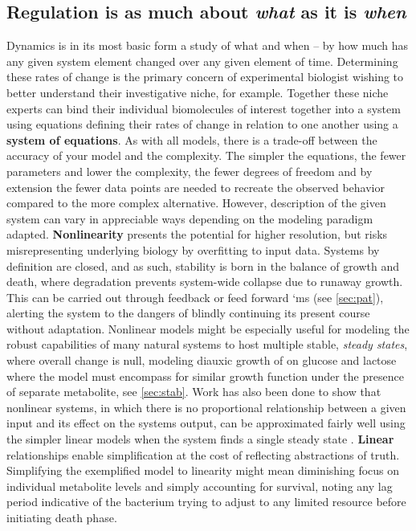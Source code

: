 \subsection{Regulation is as much about \emph{what} as it is \emph{when}}
\label{sec:regwhatwhen}
Dynamics is in its most basic form a study of what and when -- by how much has any given system element changed over any given element of time. Determining these rates of change is the primary concern of experimental biologist wishing to better understand their investigative niche, for example. Together these niche experts can bind their individual biomolecules of interest together into a system using equations defining their rates of change in relation to one another using a \textbf{system of equations}. As with all models, there is a trade-off between the accuracy of your model and the complexity. The simpler the equations, \ie the fewer parameters and lower the complexity, the fewer degrees of freedom and by extension the fewer data points are needed to recreate the observed behavior compared to the more complex alternative. However, description of the given system can vary in appreciable ways depending on the modeling paradigm adapted. 
\textbf{Nonlinearity} presents the potential for higher resolution, but risks misrepresenting underlying biology by overfitting to input data. Systems by definition are closed, and as such, stability is born in the balance of growth and death, where degradation prevents system-wide collapse due to runaway growth\citep{alon2007design}. This can be carried out through feedback or feed forward `ms (see \cref{sec:pat}), alerting the system to the dangers of blindly continuing its present course without adaptation. Nonlinear models might be especially useful for modeling the robust capabilities of many natural systems to host multiple stable, \emph{steady states}, where overall change is null, \eg modeling diauxic growth of \coli on glucose and lactose \citep{wong1997mathematical} where the model must encompass for similar growth function under the presence of separate metabolite, see \cref{sec:stab}. 
Work has also been done to show that nonlinear systems, in which there is no proportional relationship between a given input and its effect on the systems output, can be approximated fairly well using the simpler linear models when the system finds a single steady state \citep{wildenhain2006reconstructing, crampin2006system,zavlanos2011inferring}.  \textbf{Linear} relationships enable simplification at the cost of reflecting abstractions of truth. Simplifying the exemplified model to linearity might mean diminishing focus on individual metabolite levels and simply accounting for survival, \eg noting any lag period indicative of the bacterium trying to adjust to any limited resource before initiating death phase.


